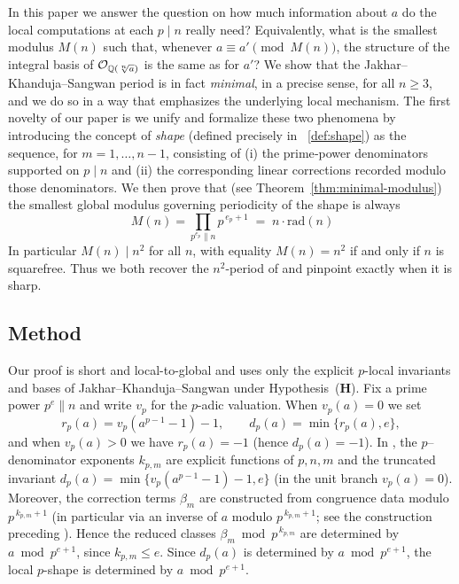 \documentclass[12pt,a4paper,oneside]{amsart}
\theoremstyle{definition}
\begin{document}
In this paper we answer the question on how much information about \(a\) do the local computations at each \(p\mid n\) really need?  Equivalently, what is the smallest modulus \(M(n)\) such that, whenever \(a\equiv a'\pmod{M(n)}\), the structure of the integral basis of \(\mathcal O_{\Bbb Q(\sqrt[n]{a})}\) is the same as for \(a'\)? We show that the Jakhar--Khanduja--Sangwan period is in fact \emph{minimal}, in a precise sense, for all \(n\ge3\), and we do so in a way that emphasizes the underlying local mechanism. The first novelty of our paper is we unify and formalize these two phenomena by introducing the concept of \emph{shape} (defined precisely in ~\ref{def:shape}) as the sequence, for \(m=1,\dots,n-1\), consisting of (i) the prime‐power denominators supported on \(p\mid n\) and (ii) the corresponding linear corrections recorded modulo those denominators. We then prove that (see Theorem~\ref{thm:minimal-modulus}) the smallest global modulus governing periodicity of the shape is always
\[
\ M(n)=\prod_{p^{e_p}\parallel n} p^{\,e_p+1}\;=\;n\cdot\mathrm{rad}(n)
\]
In particular \(M(n)\mid n^2\) for all \(n\), with equality \(M(n)=n^2\) if and only if \(n\) is squarefree. Thus we both recover the \(n^2\)-period of \cite{GR17} and pinpoint exactly when it is sharp.

\medskip
\subsection*{Method}
Our proof is short and local-to-global and uses only the explicit $p$-local invariants and bases of Jakhar--Khanduja--Sangwan \cite{JKS21} under Hypothesis~(\textbf{H}). Fix a prime power $p^e\parallel n$ and write $v_p$ for the $p$-adic valuation. When $v_p(a)=0$ we set
\[
r_p(a)=v_p(a^{p-1}-1)-1,\qquad d_p(a)=\min\{r_p(a),e\},
\]
and when $v_p(a)>0$ we have $r_p(a)=-1$ (hence $d_p(a)=-1$). In \cite[Theorem~1.6]{JKS21}, the $p$--denominator exponents $k_{p,m}$ are explicit functions of $p,n,m$ and the truncated invariant $d_p(a)=\min\{v_p(a^{p-1}-1)-1,e\}$ (in the unit branch $v_p(a)=0$). Moreover, the correction terms $\beta_m$ are constructed from congruence data modulo $p^{\,k_{p,m}+1}$ (in particular via an inverse of $a$ modulo $p^{\,k_{p,m}+1}$; see the construction preceding \cite[Theorem~1.6]{JKS21}). Hence the reduced classes $\beta_m\bmod p^{\,k_{p,m}}$ are determined by $a\bmod p^{e+1}$, since $k_{p,m}\le e$. Since $d_p(a)$ is determined by $a\bmod p^{e+1}$, the local $p$-shape is determined by $a\bmod p^{e+1}$.
\end{document}
